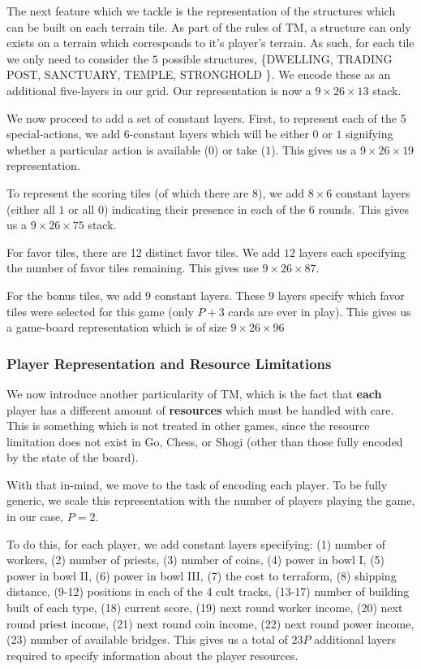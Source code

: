 \documentclass[8pt,twocolumn]{article}
\begin{document}
The next feature which we tackle is the representation of the structures which can be built on each terrain tile. As part of the rules of TM, a structure can only exists on a terrain which corresponds to it's player's terrain. As such, for each tile we only need to consider the $5$ possible structures, \{DWELLING, TRADING POST, SANCTUARY, TEMPLE, STRONGHOLD \}. We encode these as an additional five-layers in our grid. Our representation is now a $9 \times 26 \times 13$ stack.

We now proceed to add a set of constant layers. First, to represent each of the 5 special-actions, we add $6$-constant layers which will be either $0$ or $1$ signifying whether a particular action is available ($0$) or take ($1$). This gives us a $9 \times 26 \times 19$ representation.

To represent the scoring tiles (of which there are 8), we add $8\times6$ constant layers (either all $1$ or all $0$) indicating their presence in each of the $6$ rounds. This gives us a $9 \times 26 \times 75$ stack.

For favor tiles, there are 12 distinct favor tiles. We add $12$ layers each specifying the number of favor tiles remaining. This gives use $9 \times 26 \times 87$.

For the bonus tiles, we add $9$ constant layers. These $9$ layers specify which favor tiles were selected for this game (only $P + 3$ cards are ever in play). This gives us a game-board representation which is of size $9 \times 26 \times 96$

\subsubsection{Player Representation and Resource Limitations}
\label{subsubsection:player_representation_and_resource_limitations}
We now introduce another particularity of TM, which is the fact that \textbf{each} player has a different amount of \textbf{resources} which must be handled with care. This is something which is not treated in other games, since the resource limitation does not exist in Go, Chess, or Shogi (other than those fully encoded by the state of the board).

With that in-mind, we move to the task of encoding each player. To be fully generic, we scale this representation with the number of players playing the game, in our case, $P = 2$.

To do this, for each player, we add constant layers specifying: (1) number of workers, (2) number of priests,  (3) number of coins, (4) power in bowl I, (5) power in bowl II, (6) power in bowl III, (7) the cost to terraform, (8) shipping distance, (9-12) positions in each of the 4 cult tracks, (13-17) number of building built of each type, (18) current score, (19) next round worker income, (20) next round priest income, (21) next round coin income, (22) next round power income, (23) number of available bridges. This gives us a total of $23P$ additional layers required to specify information about the player resources.
\end{document}
